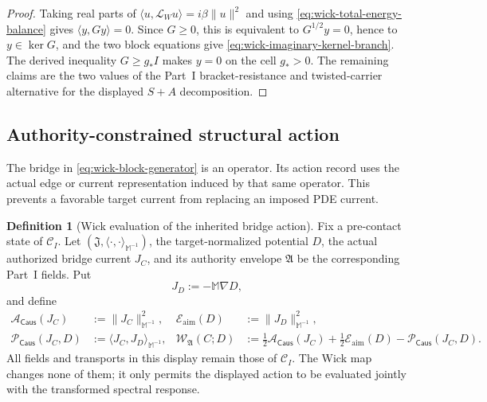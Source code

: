 \documentclass[11pt]{article}
\numberwithin{section}{part}
\theoremstyle{plain}
\theoremstyle{definition}
\newtheorem{definition}[definition]{Definition}
\theoremstyle{remark}
\newcommand{\Caus}{\mathsf{Caus}}
\begin{document}
\begin{proof}
Taking real parts of
\(\langle u,\mathcal L_Wu\rangle=i\beta\|u\|^2\) and using
\eqref{eq:wick-total-energy-balance} gives
\(\langle y,Gy\rangle=0\).  Since \(G\ge0\), this is equivalent to
\(G^{1/2}y=0\), hence to \(y\in\ker G\), and the two block equations give
\eqref{eq:wick-imaginary-kernel-branch}.  The derived inequality
\(G\ge g_*I\) makes \(y=0\) on the cell \(g_*>0\).  The remaining claims
are the two values of the Part~I bracket-resistance and twisted-carrier
alternative for the displayed \(S+A\) decomposition.
\end{proof}

\subsection{Authority-constrained structural action}
\label{subsec:wick-structural-action}

The bridge in \eqref{eq:wick-block-generator} is an operator.  Its action
record uses the actual edge or current representation induced by that same
operator.  This prevents a favorable target current from replacing an
imposed PDE current.

\begin{definition}[Wick evaluation of the inherited bridge action]
\label{def:wick-bridge-action}
Fix a pre-contact state of \(\mathscr C_I\).  Let
\((\mathfrak J,\langle\cdot,\cdot\rangle_{\mathbb M^{-1}})\), the
target-normalized potential \(D\), the actual authorized bridge current
\(J_C\), and its authority envelope \(\mathfrak A\) be the corresponding
Part~I fields.  Put
\[
 J_D:=-\mathbb M\nabla D,
 \]
and define
\begin{align}
 \mathcal A_{\Caus}(J_C)
 &:=\|J_C\|_{\mathbb M^{-1}}^2,
 &
 \mathcal E_{\mathrm{aim}}(D)
 &:=\|J_D\|_{\mathbb M^{-1}}^2,
 \label{eq:wick-action-aiming}\\
 \mathcal P_{\Caus}(J_C,D)
 &:=\langle J_C,J_D\rangle_{\mathbb M^{-1}},
 &
 \mathscr W_{\mathfrak A}(C;D)
 &:=\frac12\mathcal A_{\Caus}(J_C)
   +\frac12\mathcal E_{\mathrm{aim}}(D)
   -\mathcal P_{\Caus}(J_C,D).
 \label{eq:wick-zero-waste-action}
\end{align}
All fields and transports in this display remain those of \(\mathscr C_I\).
The Wick map changes none of them; it only permits the displayed action to be
evaluated jointly with the transformed spectral response.
\end{definition}
\end{document}
